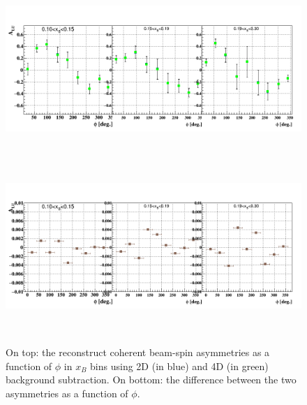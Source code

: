 \begin{enumerate}
\begin{enumerate}
 \begin{figure}[tbp]
    \includegraphics[height=6.6cm]{fig/BSA_Coherent_xB.png}
    \includegraphics[height=6.6cm]{fig/diff_BSA_Coherent_xB.png}
    \caption{On top: the reconstruct coherent beam-spin asymmetries as a 
    function of $\phi$ in $x_{B}$ bins using 2D (in blue) and 4D (in green) 
 background subtraction.  On bottom: the difference between the two asymmetries 
 as a function of $\phi$.}
    \label{fig:coh_binning}
    \end{figure}            


\end{enumerate}
\end{enumerate}
